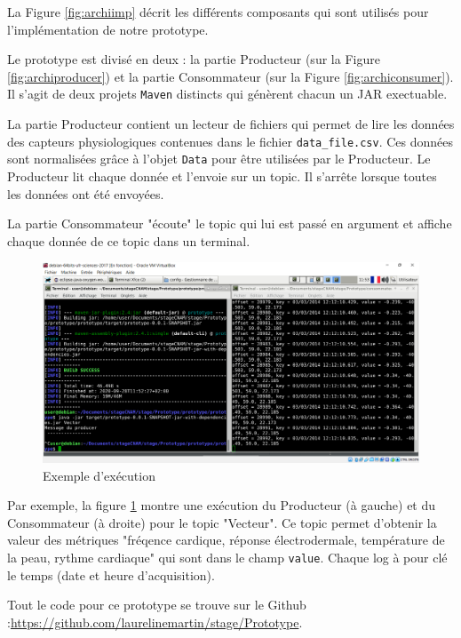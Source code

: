 \documentclass[11pt]{article}
\begin{document}
			La Figure \ref{fig:archiimp} décrit les différents composants qui sont utilisés pour l'implémentation de notre prototype.\par
			Le prototype est divisé en deux :
			la partie Producteur (sur la Figure \ref{fig:archiproducer}) et la partie Consommateur (sur la Figure \ref{fig:archiconsumer}). 
			Il s'agit de deux projets \texttt{Maven} distincts qui génèrent chacun un JAR exectuable.\par
			La partie Producteur contient un lecteur de fichiers qui permet de lire les données des capteurs physiologiques contenues dans le fichier \texttt{data\_file.csv}. 
			Ces données sont normalisées grâce à l'objet \texttt{Data} pour être utilisées par le Producteur.
			Le Producteur lit chaque donnée et l'envoie sur un topic.
			Il s'arrête lorsque toutes les données ont été envoyées.\par
			La partie Consommateur "écoute" le topic qui lui est passé en argument et affiche chaque donnée de ce topic dans un terminal.\par
			\begin{figure}
				\hspace*{-0.7cm}
				\includegraphics[scale=0.5]{../include/producteurConsommateur.PNG}
				\caption{Exemple d'exécution}
				\label{fig:exemple}
			\end{figure}
			Par exemple, la figure \ref{fig:exemple} montre une exécution du Producteur (à gauche) et du Consommateur (à droite) pour le topic "Vecteur".
			Ce topic permet d'obtenir la valeur des métriques "fréqence cardique, réponse électrodermale, température de la peau, rythme cardiaque" qui sont dans le champ \texttt{value}.
			Chaque log à pour clé le temps (date et heure d'acquisition).\par
			Tout le code pour ce prototype se trouve sur le Github :\newline \href{https://github.com/laurelinemartin/stage/Prototype}{https://github.com/laurelinemartin/stage/Prototype}.
\end{document}

